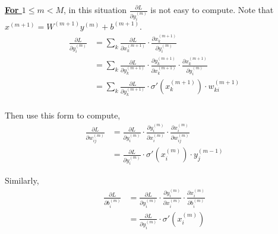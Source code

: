 \documentclass[11pt,a4paper]{article}
\begin{document}
\textbf{\underline{For $1\leq m< M$}}, in this situation $\frac{\partial L}{\partial y_i^{(m)}}$ is not easy to compute. Note that $x^{(m+1)}=W^{(m+1)}y^{(m)}+b^{(m+1)}$.
\begin{equation}
    \begin{aligned}
    \frac{\partial L}{\partial y_i^{(m)}}&=\sum_k \frac{\partial L}{\partial x_{k}^{(m+1)}}\cdot \frac{\partial x_{k}^{(m+1)}}{\partial y_i^{(m)}}\\
    &=\sum_k \frac{\partial L}{\partial y_{k}^{(m+1)}}\cdot\frac{\partial y_{k}^{(m+1)}}{\partial x_{k}^{(m+1)}}\cdot \frac{\partial x_{k}^{(m+1)}}{\partial y_i^{(m)}}\\
    &=\sum_k \frac{\partial L}{\partial y_{k}^{(m+1)}}\cdot\sigma'(x_k^{(m+1)})\cdot w_{ki}^{(m+1)}\\
    \end{aligned}
    \nonumber
\end{equation}

Then use this form to compute,
\begin{equation}
    \begin{aligned}
        \frac{\partial L}{\partial w_{ij}^{(m)}}&=\frac{\partial L}{\partial y_i^{(m)}}\cdot \frac{\partial y_i^{(m)}}{\partial x_{i}^{(m)}}\cdot \frac{\partial x_{i}^{(m)}}{\partial w_{ij}^{(m)}}\\
        &=\frac{\partial L}{\partial y_i^{(m)}}\cdot \sigma'(x_{i}^{(m)}) \cdot y_j^{(m-1)}
    \end{aligned}
    \nonumber
\end{equation}

Similarly,
\begin{equation}
    \begin{aligned}
        \frac{\partial L}{\partial b_{i}^{(m)}}&=\frac{\partial L}{\partial y_i^{(m)}}\cdot \frac{\partial y_i^{(m)}}{\partial x_{i}^{(m)}}\cdot \frac{\partial x_{i}^{(m)}}{\partial b_{i}^{(m)}}\\
        &=\frac{\partial L}{\partial y_i^{(m)}}\cdot \sigma'(x_{i}^{(m)})
    \end{aligned}
    \nonumber
\end{equation}

\begin{center}
\end{center}
\end{document}
